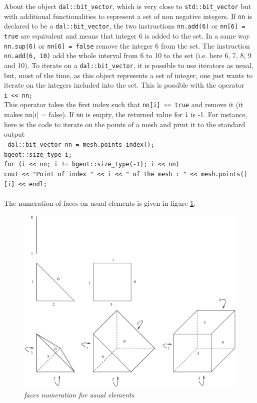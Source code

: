 \documentclass[11pt,a4paper]{article}
\begin{document}
About the object {\tt dal::bit\_vector}, which is very close to {\tt std::bit\_vector} but with additional functionalities to represent a set of non negative integers. If {\tt nn} is declared to be a {\tt dal::bit\_vector}, the two instructions {\tt nn.add(6)} or {\tt nn[6] = true} are equivalent and means that integer 6 is added to the set. In a same way {\tt nn.sup(6)} or {\tt nn[6] = false} remove the integer 6 from the set. The instruction {\tt nn.add(6, 10)} add the whole interval from 6 to 10 to the set (i.e. here 6, 7, 8, 9 and 10). To iterate on a {\tt dal::bit\_vector}, it is possible to use iterators as usual,  but, most of the time, as this object represents a set of integer, one just wants to iterate on the integers included into the set. This is possible with the operator \\[0.5cm]
{\tt i << nn; } \\[0.5cm]
This operator takes the first index such that {\tt nn[i] == true} and remove it (it makes nn[i] = false). If {\tt nn} is empty, the returned value for {\tt i} is -1. For instance, here is the code to iterate on the points of a mesh and print it to the standard output \\[0.5cm]
{\tt
  dal::bit\_vector nn = mesh.points\_index(); \\
  bgeot::size\_type i; \\
  for (i << nn; i != bgeot::size\_type(-1); i << nn) \\
  \mbox{}\hspace{1em}  cout << "Point of index " << i << " of the mesh : " << mesh.points()[i] << endl; \\
} \\[0.5cm]
The numeration of faces on usual elements is given in figure \ref{fig:elemf}.
\begin{figure}[htb] \label{fig:elemf}
  \begin{center}
    \includegraphics[width=15cm,angle=0]{getfemuserelemf.eps}
  \end{center}
  \caption{ \it faces numeration for usual elements }
\end{figure}
\end{document}
